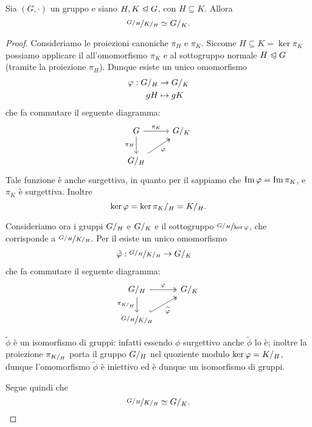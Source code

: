 \begin{theorem}
     \label{th:second_iso}
    Sia $(G, \cdot)$ un gruppo e siano $H, K \trianglelefteqslant G$, con $H \subseteq K$. Allora \begin{equation}
        \nicefrac{{G}/_{H}}{{K}/_{H}} \simeq {G}/_{K}.
    \end{equation}
\end{theorem}
\begin{proof}
    Consideriamo le proiezioni canoniche $\pi_H$ e $\pi_K$. Siccome $H \subseteq K = \ker \pi_K$ possiamo applicare il  all'omomorfismo $\pi_K$ e al sottogruppo normale $H \trianglelefteqslant G$ (tramite la proiezione $\pi_H$). Dunque esiste un unico omomorfismo \begin{align*}
        \varphi : {G}/_{H} &\to {G}/_{K}\\
        gH &\mapsto gK
    \end{align*} che fa commutare il seguente diagramma:
    \begin{equation*}
        \begin{tikzcd}
            G \arrow[d, swap, "\pi_{H}"] \arrow[r, "\pi_K"] & \quot{G}{K} \\
            \quot{G}{H} \arrow[ur, two heads, swap, "\phi"] &
        \end{tikzcd}
    \end{equation*}
    Tale funzione è anche surgettiva, in quanto per il  sappiamo che $\operatorname{Im} \varphi = \operatorname{Im} \pi_K$, e $\pi_K$ è surgettiva. Inoltre \[
        \ker \varphi = {\ker \pi_K}/_{H} = {K}/_{H}.    
    \]

    Consideriamo ora i gruppi ${G}/_{H}$ e ${G}/_{K}$ e il sottogruppo $\nicefrac{{G}/_{H}}{\ker \varphi}$, che corrisponde a $\nicefrac{{G}/_{H}}{{K}/_{H}}$. Per il  esiste un unico omomorfismo \begin{align*}
        \tilde{\varphi} : \nicefrac{{G}/_{H}}{{K}/_{H}} &\to {G}/_{K}
    \end{align*} che fa commutare il seguente diagramma:
    \begin{equation*}
        \begin{tikzcd}
            \quot{G}{H} \arrow[r, two heads, "\phi"] \arrow[d, swap, "\pi_{\quot{K}{H}}"] & \quot{G}{K} \\
            \nicefrac{\quot{G}{H}}{\quot{K}{H}} \arrow[ur, hook, two heads, swap, "\widetilde{\phi}"] &
        \end{tikzcd}
    \end{equation*}

    $\widetilde{\phi}$ è un isomorfismo di gruppi: infatti essendo $\phi$ surgettivo anche $\widetilde{\phi}$ lo è; inoltre la proiezione $\pi_{{K}/_{H}}$ porta il gruppo ${G}/_{H}$ nel quoziente modulo $\ker \varphi = {K}/_{H}$, dunque l'omomorfismo $\widetilde{\phi}$ è iniettivo ed è dunque un isomorfismo di gruppi.

    Segue quindi che \[
        \nicefrac{{G}/_{H}}{{K}/_{H}} \simeq {G}/_{K}. \qedhere 
    \]
\end{proof}

